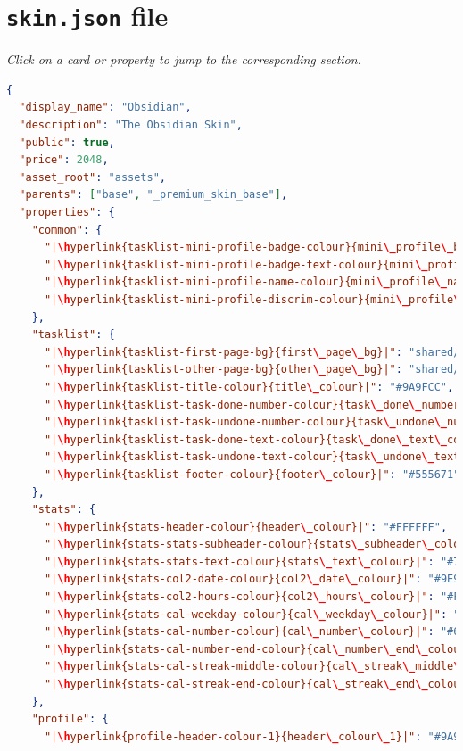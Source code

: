 \documentclass[a4paper, 10pt]{report}
\begin{document}
\section{\texttt{skin.json} file}
\emph{Click on a card or property to jump to the corresponding section.}
\begin{lstlisting}[language=json,firstnumber=1]
{
  "display_name": "Obsidian",
  "description": "The Obsidian Skin",
  "public": true,
  "price": 2048,
  "asset_root": "assets",
  "parents": ["base", "_premium_skin_base"],
  "properties": {
    "common": {
      "|\hyperlink{tasklist-mini-profile-badge-colour}{mini\_profile\_badge\_colour}|": "#FFFFFF",
      "|\hyperlink{tasklist-mini-profile-badge-text-colour}{mini\_profile\_badge\_text\_colour}|": "#414A9F",
      "|\hyperlink{tasklist-mini-profile-name-colour}{mini\_profile\_name\_colour}|": "#8282BF",
      "|\hyperlink{tasklist-mini-profile-discrim-colour}{mini\_profile\_discrim\_colour}|": "#B9BABB"
    },
    "tasklist": {
      "|\hyperlink{tasklist-first-page-bg}{first\_page\_bg}|": "shared/first_page_background.png",
      "|\hyperlink{tasklist-other-page-bg}{other\_page\_bg}|": "shared/second_page_background.png",
      "|\hyperlink{tasklist-title-colour}{title\_colour}|": "#9A9FCC",
      "|\hyperlink{tasklist-task-done-number-colour}{task\_done\_number\_colour}|": "#7E6FB2",
      "|\hyperlink{tasklist-task-undone-number-colour}{task\_undone\_number\_colour}|": "#7E6FB2",
      "|\hyperlink{tasklist-task-done-text-colour}{task\_done\_text\_colour}|": "#515151",
      "|\hyperlink{tasklist-task-undone-text-colour}{task\_undone\_text\_colour}|": "#F3F3F3",
      "|\hyperlink{tasklist-footer-colour}{footer\_colour}|": "#555671"
    },
    "stats": {
      "|\hyperlink{stats-header-colour}{header\_colour}|": "#FFFFFF",
      "|\hyperlink{stats-stats-subheader-colour}{stats\_subheader\_colour}|": "#9E9E9E",
      "|\hyperlink{stats-stats-text-colour}{stats\_text\_colour}|": "#757271",
      "|\hyperlink{stats-col2-date-colour}{col2\_date\_colour}|": "#9E9E9E",
      "|\hyperlink{stats-col2-hours-colour}{col2\_hours\_colour}|": "#FFFFFF",
      "|\hyperlink{stats-cal-weekday-colour}{cal\_weekday\_colour}|": "#FFFFFF",
      "|\hyperlink{stats-cal-number-colour}{cal\_number\_colour}|": "#6E7877",
      "|\hyperlink{stats-cal-number-end-colour}{cal\_number\_end\_colour}|": "#FFFFFF",
      "|\hyperlink{stats-cal-streak-middle-colour}{cal\_streak\_middle\_colour}|": "#54548040",
      "|\hyperlink{stats-cal-streak-end-colour}{cal\_streak\_end\_colour}|": "#545480"
    },
    "profile": {
      "|\hyperlink{profile-header-colour-1}{header\_colour\_1}|": "#9A9FCD",

\end{lstlisting}
\end{document}
